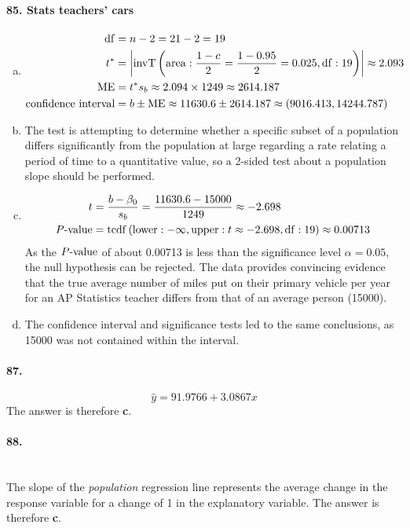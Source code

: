 \documentclass[../Homework]{subfiles}
\begin{document}
		\paragraph{85. Stats teachers' cars}
			\begin{enumerate}[a.]
				\item
					\begin{align*}
						\operatorname{df} &= n - 2 = 21 - 2 = 19 \\
						t^* &= \left|\operatorname{invT}\left(\operatorname{area}: \frac{1 - c}{2} = \frac{1 - 0.95}{2} = 0.025, \operatorname{df}: 19\right)\right| \approx 2.093 \\
						\operatorname{ME} &= t^*s_b \approx 2.094 \times 1249 \approx 2614.187 \\
						\text{confidence interval} &= b \pm \operatorname{ME} \approx 11630.6 \pm 2614.187 \approx (9016.413, 14244.787)
					\end{align*}
				\item
					The test is attempting to determine whether a specific subset of a population differs significantly from the population at large regarding a rate relating a period of time to a quantitative value, so a 2-sided test about a population slope should be performed.
				\item
					\begin{align*}
						t &= \frac{b - \beta_0}{s_b} = \frac{11630.6 - 15000}{1249} \approx -2.698 \\
						P\text{-value} &= \operatorname{tcdf}\left(\operatorname{lower}: -\infty, \operatorname{upper}: t \approx -2.698, \operatorname{df}: 19\right) \approx 0.00713
					\end{align*}
					As the $P\text{-value}$ of about 0.00713 is less than the significance level $\alpha = 0.05$, the null hypothesis can be rejected. The data provides convincing evidence that the true average number of miles put on their primary vehicle per year for an AP\textsuperscript{\textregistered} Statistics teacher differs from that of an average person (15000).
				\item
					The confidence interval and significance tests led to the same conclusions, as 15000 was not contained within the interval.
			\end{enumerate}
		\paragraph{87.}
			\[\hat{y} = 91.9766 + 3.0867x\]
			The answer is therefore \textbf{c}.
		\paragraph{88.}\ \\
		The slope of the \emph{population} regression line represents the average change in the response variable for a change of 1 in the explanatory variable. The answer is therefore \textbf{c}.
\end{document}
